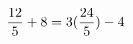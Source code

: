 \documentclass[preview]{standalone}
\begin{document}
\begin{align*}
\special{dvisvgm:raw <g id='unique000'>}\frac{12}{5} + 8 = 3(\frac{24}{5}) - 4\special{dvisvgm:raw </g>}
\end{align*}
\end{document}
